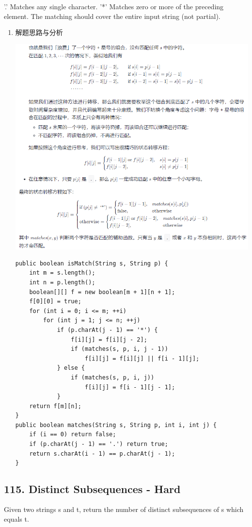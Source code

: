 \documentclass[9pt, b5paaper]{book}
\begin{document}
'.' Matches any single character.​​​​
'*' Matches zero or more of the preceding element.
The matching should cover the entire input string (not partial).
\begin{enumerate}
\item 解题思路与分析
\label{sec-1-2-2-1}

\includegraphics[width=.9\linewidth]{./pic/regMatch.png}

\begin{verbatim}
public boolean isMatch(String s, String p) {
    int m = s.length();
    int n = p.length();
    boolean[][] f = new boolean[m + 1][n + 1];
    f[0][0] = true;
    for (int i = 0; i <= m; ++i) 
        for (int j = 1; j <= n; ++j) 
            if (p.charAt(j - 1) == '*') {
                f[i][j] = f[i][j - 2];
                if (matches(s, p, i, j - 1)) 
                    f[i][j] = f[i][j] || f[i - 1][j];
            } else {
                if (matches(s, p, i, j)) 
                    f[i][j] = f[i - 1][j - 1];
            }
    return f[m][n];
}
public boolean matches(String s, String p, int i, int j) {
    if (i == 0) return false;
    if (p.charAt(j - 1) == '.') return true;
    return s.charAt(i - 1) == p.charAt(j - 1);
}
\end{verbatim}
\end{enumerate}
\subsection{115. Distinct Subsequences - Hard}
\label{sec-1-2-3}
Given two strings s and t, return the number of distinct subsequences of s which equals t.
\end{document}
